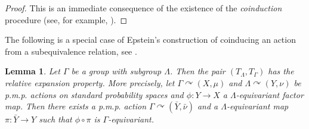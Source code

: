 \documentclass[12pt]{amsart}
\newtheorem{lem}[thm]{Lemma}
\theoremstyle{definition}
\newcommand{\pmp}{p{$.$}m{$.$}p{$.$}}
\newcommand{\acts}{\curvearrowright}
\begin{document}
\begin{proof}
This is an immediate consequence of the existence of the \emph{coinduction} procedure (see, for example, \cite[Section 10(G)]{kechrisglobal}).
\end{proof}

The following is a special case of Epstein's construction of coinducing an action from a subequivalence relation, see \cite[Section 3]{IKT}.

\begin{lem}\label{relexpgroups}
Let $\Gamma$ be a group with subgroup $\Lambda$.  Then the pair $(T_\Lambda,T_\Gamma)$ has the relative expansion property.  More precisely, let $\Gamma \acts (X, \mu)$ and $\Lambda \acts (Y, \nu)$ be {\pmp} actions on standard probability spaces and $\phi : Y \rightarrow X$ a $\Lambda$-equivariant factor map. Then there exists a {\pmp} action $\Gamma \acts (\bar{Y}, \bar{\nu})$ and a $\Lambda$-equivariant map $\pi : \bar{Y} \rightarrow Y$ such that $\phi \circ \pi$ is $\Gamma$-equivariant.
\end{lem}
\end{document}
